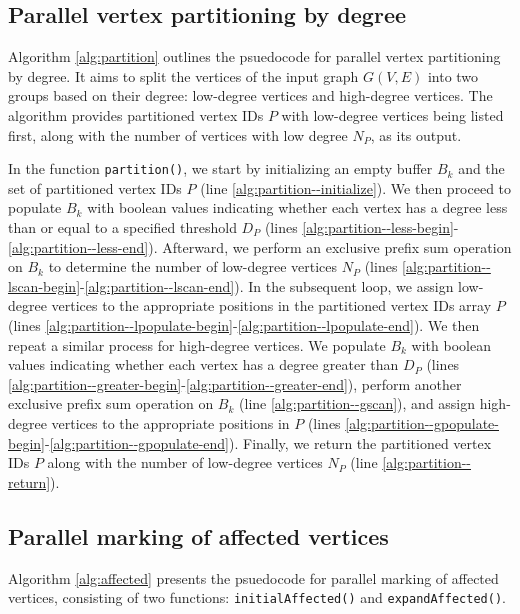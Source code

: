 \subsection{Parallel vertex partitioning by degree}
\label{sec:partition}

Algorithm \ref{alg:partition} outlines the psuedocode for parallel vertex partitioning by degree. It aims to split the vertices of the input graph $G(V, E)$ into two groups based on their degree: low-degree vertices and high-degree vertices. The algorithm provides partitioned vertex IDs $P$ with low-degree vertices being listed first, along with the number of vertices with low degree $N_P$, as its output.

In the function \texttt{partition()}, we start by initializing an empty buffer $B_k$ and the set of partitioned vertex IDs $P$ (line \ref{alg:partition--initialize}). We then proceed to populate $B_k$ with boolean values indicating whether each vertex has a degree less than or equal to a specified threshold $D_P$ (lines \ref{alg:partition--less-begin}-\ref{alg:partition--less-end}). Afterward, we perform an exclusive prefix sum operation on $B_k$ to determine the number of low-degree vertices $N_P$ (lines \ref{alg:partition--lscan-begin}-\ref{alg:partition--lscan-end}). In the subsequent loop, we assign low-degree vertices to the appropriate positions in the partitioned vertex IDs array $P$ (lines \ref{alg:partition--lpopulate-begin}-\ref{alg:partition--lpopulate-end}). We then repeat a similar process for high-degree vertices. We populate $B_k$ with boolean values indicating whether each vertex has a degree greater than $D_P$ (lines \ref{alg:partition--greater-begin}-\ref{alg:partition--greater-end}), perform another exclusive prefix sum operation on $B_k$ (line \ref{alg:partition--gscan}), and assign high-degree vertices to the appropriate positions in $P$ (lines \ref{alg:partition--gpopulate-begin}-\ref{alg:partition--gpopulate-end}). Finally, we return the partitioned vertex IDs $P$ along with the number of low-degree vertices $N_P$ (line \ref{alg:partition--return}).


\subsection{Parallel marking of affected vertices}
\label{sec:affected}

Algorithm \ref{alg:affected} presents the psuedocode for parallel marking of affected vertices, consisting of two functions: \texttt{initialAffected()} and \texttt{expandAffected()}.

